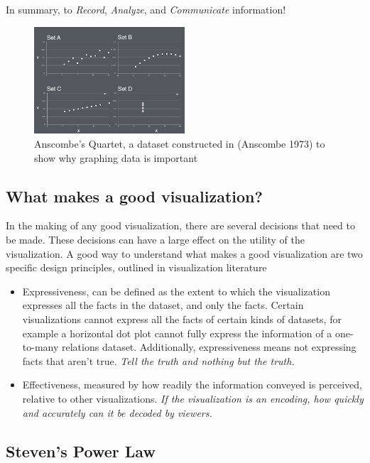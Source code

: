 In summary, to {\it Record}, {\it Analyze}, and {\it Communicate} information!


\begin{figure}[ht]
  \begin{center}
    \includegraphics[width=0.5\textwidth]{figures/figure1.png}
    \caption{
      Anscombe's Quartet, a dataset constructed in (Anscombe 1973) to show why graphing data is important}
    \label{fig:example_figure}
  \end{center}
\end{figure}

\subsection{What makes a good visualization?}

In the making of any good visualization, there are several decisions that need to be made. These decisions can have a large effect on the utility of the visualization. A good way to understand what makes a good visualization are two specific design principles, outlined in visualization literature

\begin{itemize}
  \item Expressiveness, can be defined as the extent to which the visualization expresses all the facts in the dataset, and only the facts. Certain visualizations cannot express all the facts of certain kinds of datasets, for example a horizontal dot plot cannot fully express the information of a one-to-many relations dataset. Additionally, expressiveness means not expressing facts that aren't true. {\it Tell the truth and nothing but the truth.}
  \item Effectiveness, measured by how readily the information conveyed is perceived, relative to other visualizations. {\it If the visualization is an encoding, how quickly and accurately can it be decoded by viewers.}
\end{itemize}


\subsection{Steven's Power Law}

